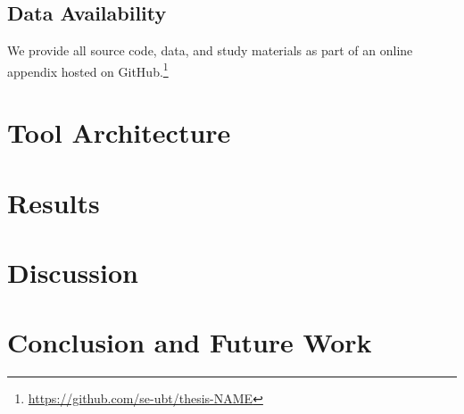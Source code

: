 \documentclass[
    pdftex,
    final,
    11pt,
    a4paper,
    parskip=false, %
    twoside, %
    footheight=0mm, %
    footinclude=false,
    toc=bibliography, %
    toc=listof %
]{scrbook} %
\begin{document}
\lipsum[1-4]

\section{Data Availability}
\label{sec:data-availability}

We provide all source code, data, and study materials as part of an online appendix hosted on GitHub.\footnote{\url{https://github.com/se-ubt/thesis-NAME}}


\chapter{Tool Architecture}
\label{ch:tool-architecture}

\lipsum[1-4]

\chapter{Results}
\label{ch:results}

\lipsum[1-4]

\chapter{Discussion}
\label{ch:discussion}

\lipsum[1-4]

\chapter{Conclusion and Future Work}
\label{ch:conclusion}

\lipsum[1-4]

\listoffigures
 
\listoftables



\end{document}
